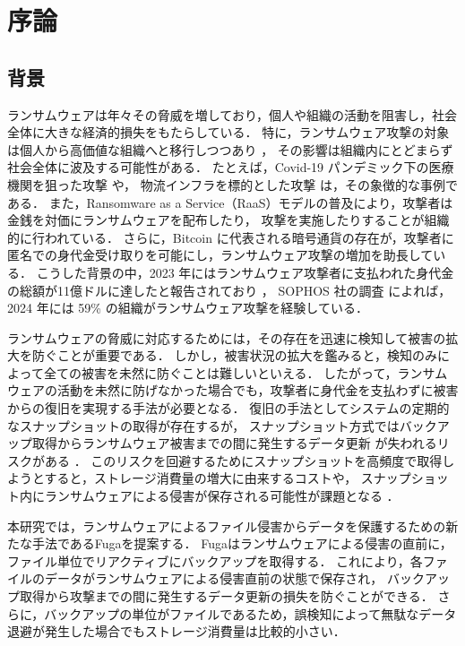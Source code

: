 \chapter{序論}
\section{背景}
ランサムウェアは年々その脅威を増しており，個人や組織の活動を阻害し，社会全体に大きな経済的損失をもたらしている．
特に，ランサムウェア攻撃の対象は個人から高価値な組織へと移行しつつあり \cite{sophos-report:online,early-detection}，
その影響は組織内にとどまらず社会全体に波及する可能性がある．
たとえば，Covid-19 パンデミック下の医療機関を狙った攻撃 \cite{Covid19R19:online} や，
物流インフラを標的とした攻撃 \cite{nagoya-port-attack} は，その象徴的な事例である．
また，Ransomware as a Service（RaaS）モデルの普及により，攻撃者は金銭を対価にランサムウェアを配布したり，
攻撃を実施したりすることが組織的に行われている．
さらに，Bitcoin に代表される暗号通貨の存在が，攻撃者に匿名での身代金受け取りを可能にし，ランサムウェア攻撃の増加を助長している．
こうした背景の中，2023 年にはランサムウェア攻撃者に支払われた身代金の総額が11億ドルに達したと報告されており \cite{Ransomwa86:online}，
SOPHOS 社の調査 \cite{sophos-report:online} によれば，2024 年には 59\% の組織がランサムウェア攻撃を経験している．

ランサムウェアの脅威に対応するためには，その存在を迅速に検知して被害の拡大を防ぐことが重要である．
しかし，被害状況の拡大を鑑みると，検知のみによって全ての被害を未然に防ぐことは難しいといえる．
したがって，ランサムウェアの活動を未然に防げなかった場合でも，攻撃者に身代金を支払わずに被害からの復旧を実現する手法が必要となる．
復旧の手法としてシステムの定期的なスナップショットの取得が存在するが，
スナップショット方式ではバックアップ取得からランサムウェア被害までの間に発生するデータ更新
が失われるリスクがある \cite{wang2024ransom}．
このリスクを回避するためにスナップショットを高頻度で取得しようとすると，ストレージ消費量の増大に由来するコストや，
スナップショット内にランサムウェアによる侵害が保存される可能性が課題となる
\cite{wang2024ransom, veena2021incremental}．

本研究では，ランサムウェアによるファイル侵害からデータを保護するための新たな手法であるFugaを提案する．
Fugaはランサムウェアによる侵害の直前に，ファイル単位でリアクティブにバックアップを取得する．
これにより，各ファイルのデータがランサムウェアによる侵害直前の状態で保存され，
バックアップ取得から攻撃までの間に発生するデータ更新の損失を防ぐことができる．
さらに，バックアップの単位がファイルであるため，誤検知によって無駄なデータ退避が発生した場合でもストレージ消費量は比較的小さい．
